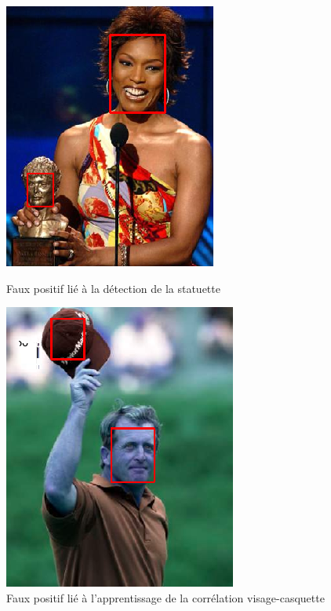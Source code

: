 \documentclass[a4paper,11pt]{article}
\begin{document}
\begin{figure}[H]
    \centering
    \begin{minipage}[c]{0.45\linewidth}
        \begin{center}
            \includegraphics[scale=0.48]{facenetFP3.png}
            \caption{Faux positif lié à la détection de la statuette}
        \end{center}
    \end{minipage} \hfill
    \begin{minipage}[c]{0.45\linewidth}
        \begin{center}
            \includegraphics[scale=0.60]{facenetFP1.png}
            \caption{Faux positif lié à l'apprentissage de la corrélation visage-casquette}
            \label{fig:casquette}
        \end{center}
    \end{minipage}
\end{figure}
\end{document}
